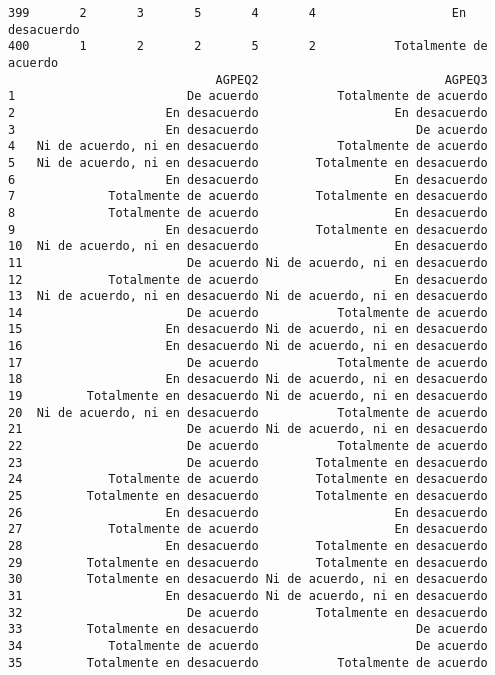 \documentclass[
  letterpaper,
  DIV=11,
  numbers=noendperiod]{scrartcl}
\begin{document}
\begin{verbatim}
399       2       3       5       4       4                   En desacuerdo
400       1       2       2       5       2           Totalmente de acuerdo
                             AGPEQ2                          AGPEQ3
1                        De acuerdo           Totalmente de acuerdo
2                     En desacuerdo                   En desacuerdo
3                     En desacuerdo                      De acuerdo
4   Ni de acuerdo, ni en desacuerdo           Totalmente de acuerdo
5   Ni de acuerdo, ni en desacuerdo        Totalmente en desacuerdo
6                     En desacuerdo                   En desacuerdo
7             Totalmente de acuerdo        Totalmente en desacuerdo
8             Totalmente de acuerdo                   En desacuerdo
9                     En desacuerdo        Totalmente en desacuerdo
10  Ni de acuerdo, ni en desacuerdo                   En desacuerdo
11                       De acuerdo Ni de acuerdo, ni en desacuerdo
12            Totalmente de acuerdo                   En desacuerdo
13  Ni de acuerdo, ni en desacuerdo Ni de acuerdo, ni en desacuerdo
14                       De acuerdo           Totalmente de acuerdo
15                    En desacuerdo Ni de acuerdo, ni en desacuerdo
16                    En desacuerdo Ni de acuerdo, ni en desacuerdo
17                       De acuerdo           Totalmente de acuerdo
18                    En desacuerdo Ni de acuerdo, ni en desacuerdo
19         Totalmente en desacuerdo Ni de acuerdo, ni en desacuerdo
20  Ni de acuerdo, ni en desacuerdo           Totalmente de acuerdo
21                       De acuerdo Ni de acuerdo, ni en desacuerdo
22                       De acuerdo           Totalmente de acuerdo
23                       De acuerdo        Totalmente en desacuerdo
24            Totalmente de acuerdo        Totalmente en desacuerdo
25         Totalmente en desacuerdo        Totalmente en desacuerdo
26                    En desacuerdo                   En desacuerdo
27            Totalmente de acuerdo                   En desacuerdo
28                    En desacuerdo        Totalmente en desacuerdo
29         Totalmente en desacuerdo        Totalmente en desacuerdo
30         Totalmente en desacuerdo Ni de acuerdo, ni en desacuerdo
31                    En desacuerdo Ni de acuerdo, ni en desacuerdo
32                       De acuerdo        Totalmente en desacuerdo
33         Totalmente en desacuerdo                      De acuerdo
34            Totalmente de acuerdo                      De acuerdo
35         Totalmente en desacuerdo           Totalmente de acuerdo

\end{verbatim}
\end{document}
